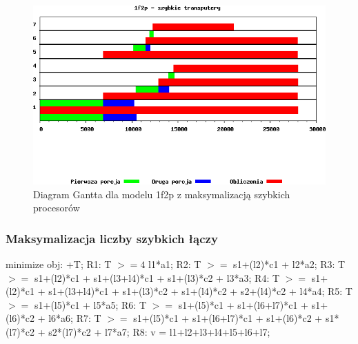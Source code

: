 \documentclass[a4paper,11pt, titlepage]{article}
\begin{document}
\begin{figure}[p!]
\includegraphics[width=1.0\textwidth]{wykresy/2p1f_proc}
\caption{Diagram Gantta dla modelu 1f2p z maksymalizacją szybkich procesorów \label{2p1f_p}}
\end{figure}

\subsubsection{Maksymalizacja liczby szybkich łączy}
\begin{flushleft}

minimize obj: +T;\linebreak
\linebreak
R1: T $>=4$ l1*a1;\linebreak
R2: T $>=$ s1+(l2)*c1 + l2*a2;\linebreak
R3: T $>=$ s1+(l2)*c1 + s1+(l3+l4)*c1 + s1+(l3)*c2 + l3*a3;\linebreak
R4: T $>=$ s1+(l2)*c1 + s1+(l3+l4)*c1 + s1+(l3)*c2 + s1+(l4)*c2 + s2+(l4)*c2 + l4*a4;\linebreak
R5: T $>=$ s1+(l5)*c1 + l5*a5;\linebreak
R6: T $>=$ s1+(l5)*c1 + s1+(l6+l7)*c1 + s1+(l6)*c2 + l6*a6;\linebreak
R7: T $>=$ s1+(l5)*c1 + s1+(l6+l7)*c1 + s1+(l6)*c2 + s1*(l7)*c2 + s2*(l7)*c2 + l7*a7;\linebreak
R8: v = l1+l2+l3+l4+l5+l6+l7;\linebreak
\end{flushleft}
\end{document}
